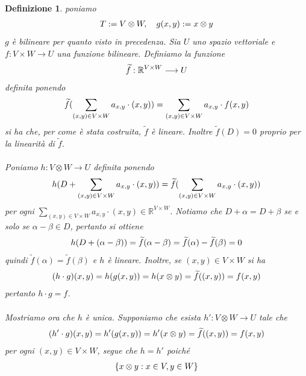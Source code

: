 \documentclass[oneside, 11pt]{amsbook}
\makeatletter
\newcommand{\0}{{(0)}}
\newcommand{\3}{{(3)}}
\theoremstyle{colonplain}
\theoremstyle{colondefinition}
\newtheorem{defn}[thm]{Definizione}
\theoremstyle{colonremark}
\numberwithin{equation}{chapter}
\renewcommand{\proofname}{Dimostrazione}
\renewenvironment{proof}[1][\proofname]{\par
  \pushQED{\qed}%
  \normalfont \topsep6\p@\@plus6\p@\relax
  \trivlist
  \item[\hskip\labelsep\bfseries #1:]\ignorespaces
}{%
  \popQED\endtrivlist\@endpefalse
}
\makeatother
\begin{document}
\begin{defn}
\begin{proof} poniamo
\begin{align}
    T := V \otimes W, \quad g(x, y) := x \otimes y \notag
\end{align}
$g$ è bilineare per quanto visto in precedenza. Sia $U$ uno spazio vettoriale e $f : V \times W \longrightarrow U$ una funzione bilineare. Definiamo la funzione
\begin{align}
    \widetilde{f} : \mathbb{R}^{V \times W} \longrightarrow U \notag
\end{align}
definita ponendo
\begin{align}
    \widetilde{f}(\sum_{(x, y) \in V \times W} a_{x, y} \cdot (x, y)) = \sum_{(x, y) \in V \times W} a_{x, y} \cdot f(x, y) \notag
\end{align}
si ha che, per come è stata costruita, $\widetilde{f}$ è lineare. Inoltre $\widetilde{f}(D) = 0$ proprio per la linearità di $\widetilde{f}$. \\ \\
Poniamo $h : V \otimes W \longrightarrow U$ definita ponendo
\begin{align}
    h(D + \sum_{(x, y) \in V \times W} a_{x, y} \cdot (x, y)) = \widetilde{f}(\sum_{(x, y) \in V \times W} a_{x, y} \cdot (x, y)) \notag
\end{align}
per ogni $\sum_{(x, y) \in V \times W} a_{x, y} \cdot (x, y) \in \mathbb{R}^{V \times W}$. Notiamo che $D + \alpha = D + \beta$ se e solo se $\alpha - \beta \in D$, pertanto si ottiene
\begin{align}
    h(D + (\alpha - \beta)) = \widetilde{f}(\alpha - \beta) = \widetilde{f}(\alpha) - \widetilde{f}(\beta) = 0 \notag
\end{align}
quindi $\widetilde{f}(\alpha) = \widetilde{f}(\beta)$ e $h$ è lineare. Inoltre, se $(x, y) \in V \times W$ si ha
\begin{align}
    (h \cdot g)(x, y) = h(g(x, y)) = h(x \otimes y) = \widetilde{f}((x, y)) = f(x, y) \notag
\end{align}
pertanto $h \cdot g = f$. \\ \\
Mostriamo ora che $h$ è unica. Supponiamo che esista $h' : V \otimes W \longrightarrow U$ tale che
\begin{align}
    (h' \cdot g)(x, y) = h'(g(x, y)) = h'(x \otimes y) = \widetilde{f}((x, y)) = f(x, y) \notag
\end{align}
per ogni $(x, y) \in V \times W$, segue che $h = h'$ poiché
\begin{align}
    \{ x \otimes y : x \in V, y \in W \} \notag

\end{align}
\end{proof}
\end{defn}
\end{document}
